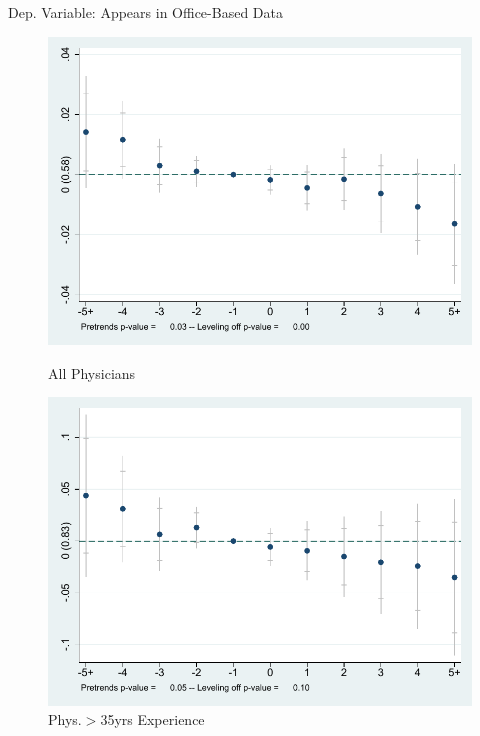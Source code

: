 \documentclass[10pt]{beamer}
\begin{document}
\begin{frame}{Dep. Variable: Appears in Office-Based Data}
\begin{figure}[ht]
        \begin{minipage}[b]{0.47\linewidth}
            \centering
            \includegraphics[width=\textwidth]{Objects/xtevent_fullsample_office.pdf}
            \caption{\small All Physicians}
        \end{minipage}
        \hspace{0.2cm}
        \begin{minipage}[b]{0.47\linewidth}
            \centering
            \includegraphics[width=\textwidth]{Objects/xtevent_oldsample_office.pdf}
            \caption{\small Phys.$>$35yrs Experience}
        \end{minipage}
    \end{figure}
\end{frame}
\end{document}
